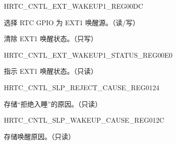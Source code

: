 \begin{register}{H}{RTC\_CNTL\_EXT\_WAKEUP1\_REG}{\hexprefix{}00DC}\label{regdesc:RTCCNTLEXTWAKEUP1REG}
%
%
%
\regnewline%
\begin{regdesc}\begin{reglist}
\label{fielddesc:RTCCNTLEXTWAKEUP1SEL}\item [RTC\_CNTL\_EXT\_WAKEUP1\_SEL] 选择 RTC GPIO 为 EXT1 唤醒源。（读/写）
\label{fielddesc:RTCCNTLEXTWAKEUP1STATUSCLR}\item [RTC\_CNTL\_EXT\_WAKEUP1\_STATUS\_CLR] 清除 EXT1 唤醒状态。（只写）
\end{reglist}\end{regdesc}
\end{register}


\begin{register}{H}{RTC\_CNTL\_EXT\_WAKEUP1\_STATUS\_REG}{\hexprefix{}00E0}\label{regdesc:RTCCNTLEXTWAKEUP1STATUSREG}
%
%
\regnewline%
\begin{regdesc}\begin{reglist}
\label{fielddesc:RTCCNTLEXTWAKEUP1STATUS}\item [RTC\_CNTL\_EXT\_WAKEUP1\_STATUS] 指示 EXT1 唤醒状态。（只读）
\end{reglist}\end{regdesc}
\end{register}


\begin{register}{H}{RTC\_CNTL\_SLP\_REJECT\_CAUSE\_REG}{\hexprefix{}0124}\label{regdesc:RTCCNTLSLPREJECTCAUSEREG}
%
%
\regnewline%
\begin{regdesc}\begin{reglist}
\label{fielddesc:RTCCNTLREJECTCAUSE}\item [RTC\_CNTL\_REJECT\_CAUSE] 存储“拒绝入睡”的原因。（只读）
\end{reglist}\end{regdesc}
\end{register}


\begin{register}{H}{RTC\_CNTL\_SLP\_WAKEUP\_CAUSE\_REG}{\hexprefix{}012C}\label{regdesc:RTCCNTLSLPWAKEUPCAUSEREG}
%
%
\regnewline%
\begin{regdesc}\begin{reglist}
\label{fielddesc:RTCCNTLWAKEUPCAUSE}\item [RTC\_CNTL\_WAKEUP\_CAUSE] 存储唤醒原因。（只读）
\end{reglist}\end{regdesc}
\end{register}


